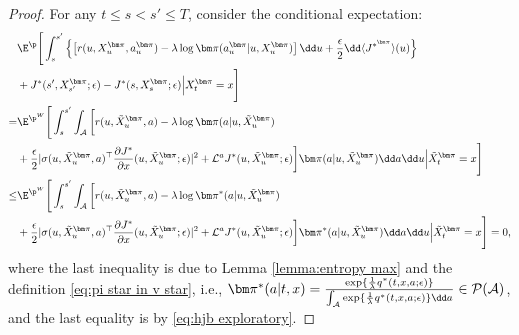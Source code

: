 \begin{proof}
For any $t\leq s < s' \leq T$, consider the conditional expectation:
\[
\begin{aligned}
& \E^{\p}\Bigg[  \int_s^{s'} \left\{ \left[ r(u, X_{u}^{\bm \pi}, a_{u}^{\bm \pi}) - \lambda\log\bm\pi(a_{u}^{\bm\pi}|u, X_{u}^{\bm\pi}) \right] \dd u + \frac{\epsilon}{2} \dd \langle  J^{*^{\bm \pi}} \rangle(u)\right\}\\
& + J^*(s', X_{s'}^{\bm \pi};\epsilon) - J^*(s, X_{s}^{\bm \pi};\epsilon)   \Big| X_t^{\bm\pi} = x \Bigg] \\
= & \E^{\p^W}\Bigg[\int_s^{s'} \int_{\mathcal{A}}\bigg[ r(u,\tilde X_u^{\bm\pi}, a) - \lambda\log\bm\pi(a|u,\tilde X_u^{\bm\pi}) \\
& + \frac{\epsilon}{2}|\sigma(u,\tilde X_u^{\bm\pi},a)^\top \frac{\partial J^*}{\partial x}(u,\tilde X_u^{\bm\pi};\epsilon)|^2 + \mathcal{L}^a J^*(u,\tilde X_u^{\bm\pi};\epsilon)     \bigg] \bm\pi(a|u, \tilde X_u^{\bm\pi})\dd a\dd u \Big| \tilde X_t^{\bm\pi} = x \Bigg] \\
\leq & \E^{\p^W}\Bigg[\int_s^{s'} \int_{\mathcal{A}}\bigg[ r(u,\tilde X_u^{\bm\pi}, a) - \lambda\log\bm\pi^*(a|u,\tilde X_u^{\bm\pi}) \\
& + \frac{\epsilon}{2}|\sigma(u,\tilde X_u^{\bm\pi},a)^\top \frac{\partial J^*}{\partial x}(u,\tilde X_u^{\bm\pi};\epsilon)|^2 + \mathcal{L}^a J^*(u,\tilde X_u^{\bm\pi};\epsilon)     \bigg] \bm\pi^*(a|u, \tilde X_u^{\bm\pi})\dd a\dd u \Big| \tilde X_t^{\bm\pi} = x \Bigg] = 0,
\end{aligned}
\]
where the last inequality is due to Lemma \ref{lemma:entropy max} and the definition \eqref{eq:pi star in v star}, i.e., $\bm\pi^*(a|t,x) = \frac{\exp\{\frac{1}{\lambda}q^*(t,x,a;\epsilon)\}}{\int_{{\cal A}} \exp\{\frac{1}{\lambda}q^*(t,x,a;\epsilon)\} \dd a} \in \mathcal{P}(\mathcal{A}) $, and the last equality is by \eqref{eq:hjb exploratory}.
\end{proof}
